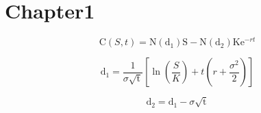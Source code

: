 \section{Chapter1}
	\label{sec:chapter1}

	\begin{equation}
	\mathrm C( S, t)= \mathrm N(\mathrm d_1)\mathrm S - \mathrm N(\mathrm d_2) \mathrm K \mathrm e^{-rt}
	\label{eq:1}
	\end{equation}

	\begin{equation}
	\mathrm d_1= \frac{1}{\sigma \sqrt{\mathrm t}} \left[\ln{\left(\frac{S}{K}\right)} + t\left(r + \frac{\sigma^2}{2} \right) \right]
	\label{eq:2}
	\end{equation}

	\begin{equation}
	\mathrm d_2= \mathrm d_1 - \sigma \sqrt{\mathrm t}
	\label{eq:3}
	\end{equation}

	\newpage
